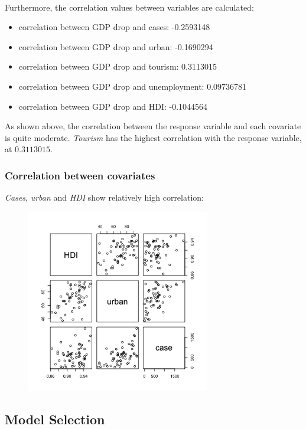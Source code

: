 \documentclass{article}
\begin{document}
\\
\noindent Furthermore, the correlation values between variables are calculated:
\begin{itemize}
    \item correlation between GDP drop and cases: -0.2593148
    \item correlation between GDP drop and urban:  -0.1690294
    \item correlation between GDP drop and tourism: 0.3113015
    \item correlation between GDP drop and unemployment: 0.09736781
    \item correlation between GDP drop and HDI: -0.1044564
\end{itemize}
As shown above, the correlation between the response variable and each covariate is quite moderate. \textit{Tourism} has the highest correlation with the response variable, at $0.3113015$.\\

\subsubsection{Correlation between covariates}
\noindent \textit{Cases}, \textit{urban} and \textit{HDI}
show relatively high correlation:
\begin{figure}[H]
  \centering
  \includegraphics[width= 8cm]{correlation.png}
  \label{fig:gggc}
\end{figure}

\subsection{Model Selection}
\end{document}
